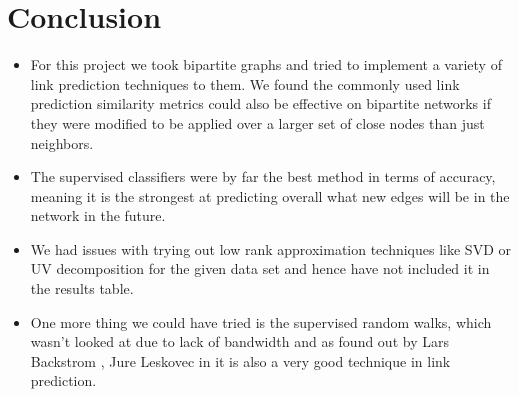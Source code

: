 \documentclass[letterpaper,twocolumn,11pt]{article}
\begin{document}
\section{Conclusion}

\begin{itemize}

\item For this project we took bipartite graphs and tried to implement a variety of link prediction techniques to them. We found the commonly used link prediction similarity metrics could also be effective on bipartite networks if they were modified to be applied over a larger set of close nodes than just neighbors.

\item  The supervised classifiers were by far the best method in terms of accuracy, meaning it is the strongest at predicting overall what new edges will be in the network in the future.

\item We had issues with trying out low rank approximation techniques like SVD or UV decomposition for the given data set and hence have not included it in the results table.

\item One more thing we could have tried is the supervised random walks, which wasn't looked at due to lack of bandwidth and as found out by Lars Backstrom , Jure Leskovec in \cite{one} it is also a very good technique in link prediction.

\end{itemize}
 
\end{document}

